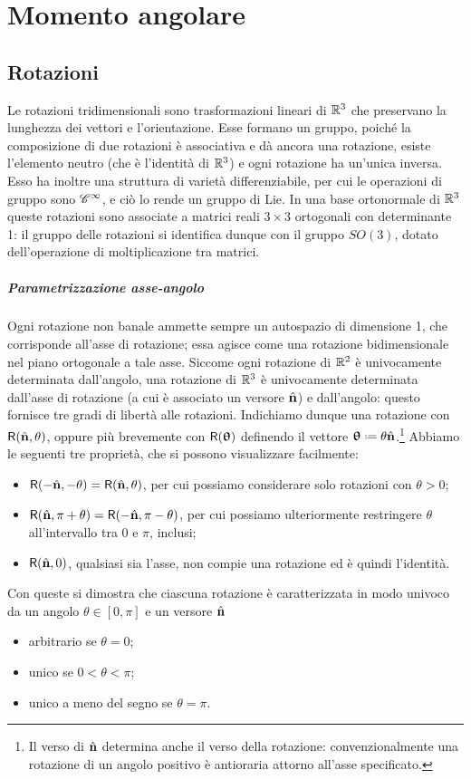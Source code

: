\chapter{Momento angolare}
\section{Rotazioni}
Le rotazioni tridimensionali sono trasformazioni lineari di $\mathbb{R}^3$ che preservano la lunghezza dei vettori e l'orientazione.
Esse formano un gruppo, poich\'e la composizione di due rotazioni è associativa e dà ancora una rotazione, esiste l'elemento neutro (che è l'identità di $\mathbb{R}^3$) e ogni rotazione ha un'unica inversa.
Esso ha inoltre una struttura di varietà differenziabile, per cui le operazioni di gruppo sono $\mathscr{C}^{{\infty}}$, e ciò lo rende un gruppo di Lie.
In una base ortonormale di $\mathbb{R}^3$ queste rotazioni sono associate a matrici reali $3\times 3$ ortogonali con determinante 1: il gruppo delle rotazioni si identifica dunque con il gruppo $SO(3)$, dotato dell'operazione di moltiplicazione tra matrici.

\paragraph{Parametrizzazione asse-angolo}
Ogni rotazione non banale ammette sempre un autospazio di dimensione 1, che corrisponde all'asse di rotazione; essa agisce come una rotazione bidimensionale nel piano ortogonale a tale asse.
Siccome ogni rotazione di $\mathbb{R}^2$ è univocamente determinata dall'angolo, una rotazione di $\mathbb{R}^3$ è univocamente determinata dall'asse di rotazione (a cui è associato un versore $\hat{\mathbf{n}}$) e dall'angolo: questo fornisce tre gradi di libertà alle rotazioni.
Indichiamo dunque una rotazione con $\mathsf{R}(\hat{\mathbf{n}},\theta)$, oppure più brevemente con $\mathsf{R}(\bm{\uptheta})$ definendo il vettore $\vtheta\defeq\theta\axis$.\footnote{Il verso di $\hat{\mathbf{n}}$ determina anche il verso della rotazione: convenzionalmente una rotazione di un angolo positivo è antioraria attorno all'asse specificato.}
Abbiamo le seguenti tre proprietà, che si possono visualizzare facilmente:
\begin{itemize}
	\item $\mathsf{R}(-\hat{\mathbf{n}},-\theta)=\mathsf{R}(\hat{\mathbf{n}},\theta)$, per cui possiamo considerare solo rotazioni con $\theta>0$;
	\item $\mathsf{R}(\hat{\mathbf{n}},\pi+\theta)=\mathsf{R}(-\hat{\mathbf{n}},\pi-\theta)$, per cui possiamo ulteriormente restringere $\theta$ all'intervallo tra $0$ e $\pi$, inclusi;
	\item $\mathsf{R}(\hat{\mathbf{n}},0)$, qualsiasi sia l'asse, non compie una rotazione ed è quindi l'identità.
\end{itemize}
Con queste si dimostra che ciascuna rotazione è caratterizzata in modo univoco da un angolo $\theta\in[0,\pi]$ e un versore $\hat{\mathbf{n}}$
\begin{itemize}
	\item arbitrario se $\theta=0$;
	\item unico se $0<\theta<\pi$;
	\item unico a meno del segno se $\theta=\pi$.
\end{itemize}

